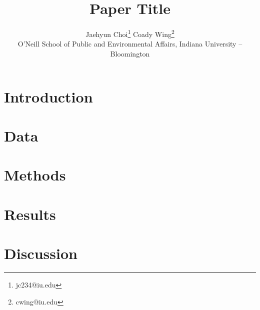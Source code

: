 \documentclass[12pt]{article}
\title{Paper Title}
\author{Jaehyun Choi\thanks{jc234@iu.edu} \quad Coady Wing\thanks{cwing@iu.edu} \\ O'Neill School of Public and Environmental Affairs, Indiana University -- Bloomington}
\begin{document}
\maketitle
\thispagestyle{empty}
\begin{abstract}
    
\end{abstract}

\newpage
\setcounter{page}{1}

\section{Introduction}


\section{Data}


\section{Methods}


\section{Results}


\section{Discussion}


\clearpage


\newpage
\printbibliography

\appendix
\clearpage

\setcounter{figure}{0} \renewcommand{\thefigure}{A.\arabic{figure}}
\setcounter{table}{0} \renewcommand{\thetable}{A.\arabic{table}}


\clearpage{}
\end{document}
